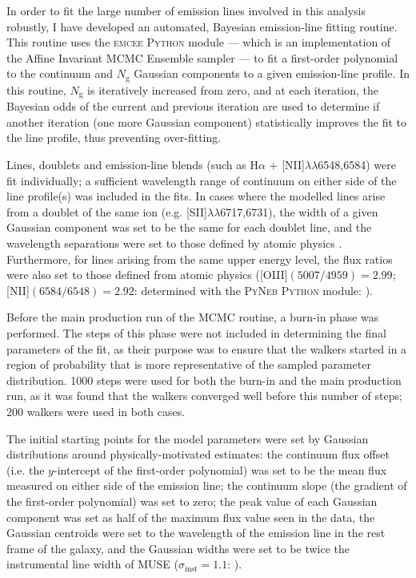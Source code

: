 In order to fit the large number of emission lines involved in this analysis robustly, I have developed an automated, Bayesian emission-line fitting routine. This routine uses the \textsc{emcee} \textsc{Python} module \citep{FormanMackey2013} --- which is an implementation of the Affine Invariant MCMC Ensemble sampler \citep{Goodman2010} --- to fit a first-order polynomial to the continuum and $N_\mathrm{g}$ Gaussian components to a given emission-line profile. In this routine, $N_\mathrm{g}$ is iteratively increased from zero, and at each iteration, the Bayesian odds of the current and previous iteration are used to determine if another iteration (one more Gaussian component) statistically improves the fit to the line profile, thus preventing over-fitting.

Lines, doublets and emission-line blends (such as H$\alpha$ + {[}NII{]}$\lambda\lambda$6548,6584) were fit individually; a sufficient wavelength range of continuum on either side of the line profile(s) was included in the fits. In cases where the modelled lines arise from a doublet of the same ion (e.g. [SII]$\lambda\lambda$6717,6731), the width of a given Gaussian component was set to be the same for each doublet line, and the wavelength separations were set to those defined by atomic physics \citep{Osterbrock2006}. Furthermore, for lines arising from the same upper energy level, the flux ratios were also set to those defined from atomic physics ([OIII]$(5007/4959)=2.99$; [NII]$(6584/6548)=2.92$: determined with the \textsc{PyNeb Python} module: \citealt{Luridiana2015}).

Before the main production run of the MCMC routine, a burn-in phase was performed. The steps of this phase were not included in determining the final parameters of the fit, as their purpose was to ensure that the walkers started in a region of probability that is more representative of the sampled parameter distribution. 1000 steps were used for both the burn-in and the main production run, as it was found that the walkers converged well before this number of steps; 200 walkers were used in both cases.

The initial starting points for the model parameters were set by Gaussian distributions around physically-motivated estimates: the continuum flux offset (i.e. the $y$-intercept of the first-order polynomial) was set to be the mean flux measured on either side of the emission line; the continuum slope (the gradient of the first-order polynomial) was set to zero; the peak value of each Gaussian component was set as half of the maximum flux value seen in the data, the Gaussian centroids were set to the wavelength of the emission line in the rest frame of the galaxy, and the Gaussian widths were set to be twice the instrumental line width of MUSE ($\sigma_\mathrm{inst}=1.1$\;{\AA}: \citealt{Weilbacher2016}).

